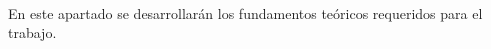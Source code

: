 \paragraph{}
En este apartado se desarrollarán los fundamentos teóricos requeridos para el trabajo.
